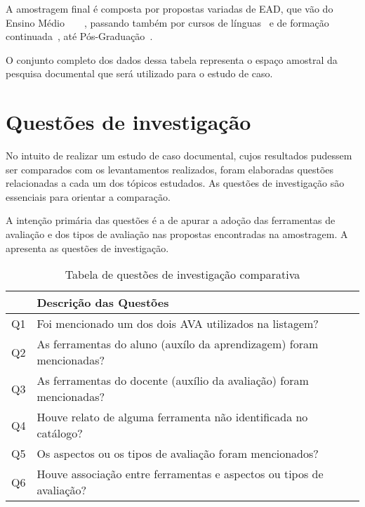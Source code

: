  A amostragem final é composta por propostas variadas de EAD, que vão do Ensino Médio~\cite{t2@ead}~\cite{t4@ead}~\cite{t5@ead}~\cite{t6@ead}, passando também por cursos de línguas~\cite{t6@ead} e de formação continuada~\cite{t3@ead}, até Pós-Graduação~\cite{t1@ead}.
 
 O conjunto completo dos dados dessa tabela representa o espaço amostral da pesquisa documental que será utilizado para o estudo de caso.

\section{Questões de investigação}%

No intuito de realizar um estudo de caso documental, cujos resultados pudessem ser comparados com os levantamentos realizados, foram elaboradas questões relacionadas a cada um dos tópicos estudados. As questões de investigação são essenciais para orientar a comparação. 

A intenção primária das questões é a de apurar a adoção das ferramentas de avaliação e dos tipos de avaliação nas propostas encontradas na amostragem. A  apresenta as questões de investigação.

\begin{table}[ht!]
\setlength{\bigstrutjot}{3pt}
\caption{Tabela de questões de investigação comparativa}
\label{tab:question}
\centering
    \begin{tabular}{|l|l|}
    \hline 
        \bigstrut
         & {Descrição das Questões}  \\
    	\hline
        \bigstrut[t]
        Q1	& Foi mencionado um dos dois AVA utilizados na listagem?\\ 	
        Q2  & As ferramentas do aluno (auxílo da aprendizagem) foram mencionadas?\\      
        Q3  & As ferramentas do docente (auxílio da avaliação) foram mencionadas?\\
        Q4  & Houve relato de alguma ferramenta não identificada no catálogo?\\          
        Q5  & Os aspectos ou os tipos de avaliação foram mencionados?\\         
        \bigstrut[b]
        Q6  & Houve associação entre ferramentas e aspectos ou tipos de avaliação?\\
    \hline
    \end{tabular}
\end{table}

